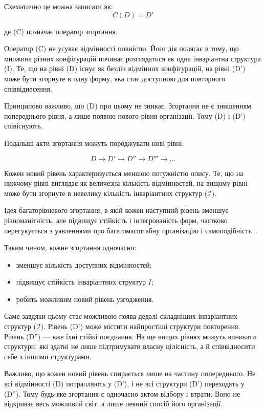 \documentclass[aps,prd,onecolumn,nofootinbib,superscriptaddress]{revtex4-2}
\begin{document}
Схематично це можна записати як:
\[C(D)=D'\]

де (C) позначає оператор згортання.

Оператор (C) не усуває відмінності повністю. Його дія полягає в тому, що множина різних конфігурацій починає розглядатися як одна інваріантна структура (I). Те, що на рівні (D) існує як безліч відмінних конфігурацій, на рівні (D') може бути згорнуте в одну форму, яка стає доступною для повторного співвіднесення.

Принципово важливо, що (D) при цьому не зникає. Згортання не є знищенням попереднього рівня, а лише появою нового рівня організації. Тому (D) і (D') співіснують.

Подальші акти згортання можуть породжувати нові рівні:

\[ D \to D' \to D'' \to D''' \to \dots \]

Кожен новий рівень характеризується меншою потужністю опису. Те, що на нижчому рівні виглядає як величезна кількість відмінностей, на вищому рівні може бути згорнуте в невелику кількість інваріантних структур ($\mathcal{I}$).

Ідея багаторівневого згортання, в якій кожен наступний рівень зменшує різноманітність, але підвищує стійкість і інтегрованість форм, частково перегукується з уявленнями про багатомасштабну організацію і самоподібність~\cite{Mandelbrot1982,Mandelbrot1977}.

Таким чином, кожне згортання одночасно:
\begin{itemize}
    \item зменшує кількість доступних відмінностей;
    \item підвищує стійкість інваріантних структур \(I\);
    \item робить можливим новий рівень узгодження.
\end{itemize}

Саме завдяки цьому стає можливою поява дедалі складніших інваріантних структур ($\mathcal{I}$). Рівень (D') може містити найпростіші структури повторення. Рівень (D'') — вже їхні стійкі поєднання. На ще вищих рівнях можуть виникати структури, які здатні не лише підтримувати власну цілісність, а й співвідносити себе з іншими структурами.

Важливо, що кожен новий рівень спирається лише на частину попереднього. Не всі відмінності (D) потрапляють у (D'), і не всі структури (D') переходять у (D''). Тому будь-яке згортання є одночасно актом відбору і втрати. Воно не відкриває весь можливий світ, а лише певний спосіб його організації.
\end{document}
